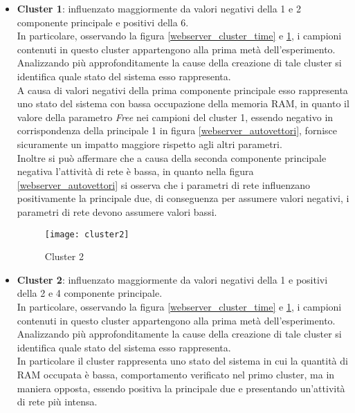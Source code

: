 \begin{itemize}

  \begin{figure}[!htbp]
    \centering
    \texttt{[image: cluster1]}
    \caption{Grafico 3D del Cluster 1}
    \label{webserver_cluster1}
  \end{figure}

  \item \textbf{Cluster 1}: influenzato maggiormente da valori negativi della
  1 e 2 componente principale e positivi della 6.\\
  In particolare, osservando la figura \ref{webserver_cluster_time} e \ref{webserver_cluster1}, i campioni contenuti
  in questo cluster appartengono alla prima metà dell'esperimento.\\
  Analizzando più approfonditamente la cause della creazione di tale cluster si
  identifica quale stato del sistema esso rappresenta.\\
  A causa di valori negativi della prima componente principale esso
  rappresenta uno stato del sistema con bassa occupazione della memoria RAM,
  in quanto il valore della parametro \textit{Free} nei campioni del cluster 1,
  essendo negativo in corrispondenza della principale 1 in figura \ref{webserver_autovettori},
  fornisce sicuramente un impatto maggiore rispetto agli altri parametri.\\
  Inoltre si può affermare che a causa della seconda componente principale negativa
  l'attività di rete è bassa, in quanto nella figura \ref{webserver_autovettori} si osserva
  che i parametri di rete influenzano positivamente la principale due, di conseguenza
  per assumere valori negativi, i parametri di rete devono assumere valori bassi.

  \clearpage

  \begin{figure}[!htbp]
    \centering
    \texttt{[image: cluster2]}
    \caption{Cluster 2}
    \label{webserver_cluster2}
  \end{figure}

  \item \textbf{Cluster 2}: influenzato maggiormente da valori negativi della
  1 e positivi della 2 e 4 componente principale.\\
  In particolare, osservando la figura \ref{webserver_cluster_time} e \ref{webserver_cluster1}, i campioni contenuti
  in questo cluster appartengono alla prima metà dell'esperimento.\\
  Analizzando più approfonditamente la cause della creazione di tale cluster si
  identifica quale stato del sistema esso rappresenta.\\
  In particolare il cluster rappresenta uno stato del sistema in cui la quantità di RAM occupata
  è bassa, comportamento verificato nel primo cluster, ma in maniera opposta,
  essendo positiva la principale due e presentando un'attività di rete più intensa.


\end{itemize}
